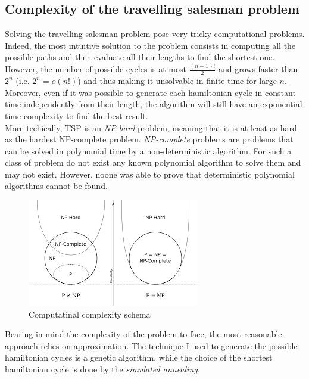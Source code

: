 \documentclass{article}
\begin{document}
\subsection{Complexity of the travelling salesman problem}
Solving the travelling salesman problem pose very tricky computational problems. Indeed, the most intuitive solution to the problem consists in computing all the possible paths and then evaluate all their lengths to find the shortest one. However, the number of possible cycles is at most $\frac{(n-1)!}{2}$ and grows faster than $2^n$ (i.e. $2^n = o(n!)$) and thus making it unsolvable in finite time for large $n$. Moreover, even if it was possible to generate each hamiltonian cycle in constant time independently from their length, the algorithm will still have an exponential time complexity to find the best result.  \\
More techically, TSP is an \textit{NP-hard} problem, meaning that it is at least as hard as the hardest NP-complete problem. \textit{NP-complete} problems are problems that can be solved in polynomial time by a non-deterministic algorithm. For such a class of problem do not exist any known polynomial algorithm to solve them and may not exist. However, noone was able to prove that deterministic polynomial algorithms cannot be found.
\begin{figure}[H]
\includegraphics[scale=0.25]{complexity_classes.png} 
\centering
\caption{Computatinal complexity schema}
\end{figure}
\noindent Bearing in mind the complexity of the problem to face, the most reasonable approach relies on approximation. The technique I used to generate the possible hamiltonian cycles is a genetic algorithm, while the choice of the shortest hamiltonian cycle is done by the \textit{simulated annealing}.
\end{document}
